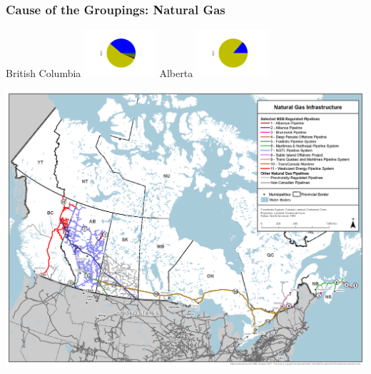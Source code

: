 \documentclass{beamer}
\begin{document}
\begin{frame}

\frametitle{Cause of the Groupings: Natural Gas}


\begin{minipage}[b]{0.7\textwidth}

\tiny{British Columbia}%
\includegraphics[width=0.2\textwidth, trim={120pt 50pt 110pt 50pt}, clip]{../British_Columbia.png}%
\tiny{Alberta}%
\includegraphics[width=0.2\textwidth, trim={120pt 50pt 110pt 50pt}, clip]{../Alberta.png}%


\includegraphics[width=\textwidth, trim={10 80pt 240pt 220pt}, clip]{natural_gas_pipeline_natural_resources_canada}
\end{minipage}%
%
%
\begin{minipage}[b]{0.3\textwidth}

\end{minipage}






\end{frame}
\end{document}
